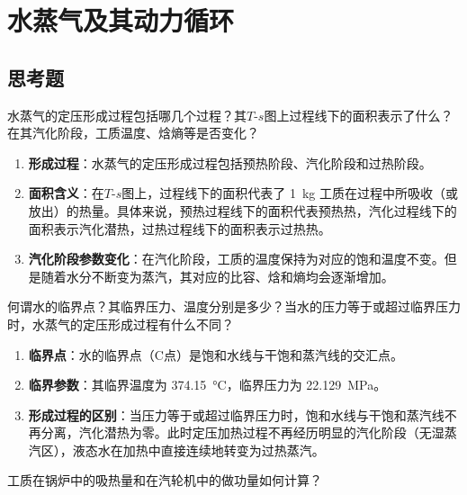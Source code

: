 \chapter{水蒸气及其动力循环}

\section{思考题}

\begin{problem}
水蒸气的定压形成过程包括哪几个过程？其\(T\)-\(s\)图上过程线下的面积表示了什么？在其汽化阶段，工质温度、焓熵等是否变化？
\end{problem}

\begin{solution}
\begin{enumerate}
  \item \textbf{形成过程}：水蒸气的定压形成过程包括预热阶段、汽化阶段和过热阶段。
  \item \textbf{面积含义}：在\(T\)-\(s\)图上，过程线下的面积代表了 \qty{1}{kg} 工质在过程中所吸收（或放出）的热量。具体来说，预热过程线下的面积代表预热热，汽化过程线下的面积表示汽化潜热，过热过程线下的面积表示过热热。
  \item \textbf{汽化阶段参数变化}：在汽化阶段，工质的温度保持为对应的饱和温度不变。但是随着水分不断变为蒸汽，其对应的比容、焓和熵均会逐渐增加。
\end{enumerate}
\end{solution}

\begin{problem}
何谓水的临界点？其临界压力、温度分别是多少？当水的压力等于或超过临界压力时，水蒸气的定压形成过程有什么不同？
\end{problem}

\begin{solution}
\begin{enumerate}
  \item \textbf{临界点}：水的临界点（C点）是饱和水线与干饱和蒸汽线的交汇点。
  \item \textbf{临界参数}：其临界温度为 \qty{374.15}{\degreeCelsius}，临界压力为 \qty{22.129}{MPa}。
  \item \textbf{形成过程的区别}：当压力等于或超过临界压力时，饱和水线与干饱和蒸汽线不再分离，汽化潜热为零。此时定压加热过程不再经历明显的汽化阶段（无湿蒸汽区），液态水在加热中直接连续地转变为过热蒸汽。
\end{enumerate}
\end{solution}

\begin{problem}
工质在锅炉中的吸热量和在汽轮机中的做功量如何计算？
\end{problem}

